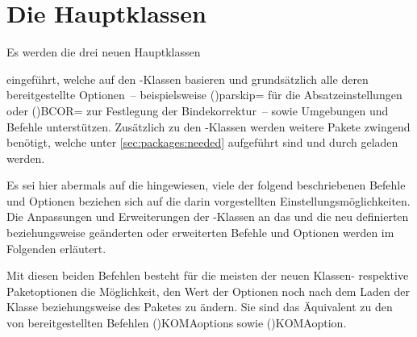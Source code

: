 \chapter[%
  Die Hauptklassen \Class{tudscrbook}, \Class{tudscrreprt} und 
  \Class{tudscrartcl}%
]{%
  Die Hauptklassen%
}

\begin{DeclareEntity*}{}
\begin{DeclareEntity*}{}
\begin{DeclareEntity*}{}
%
Es werden die drei neuen Hauptklassen
%
\begin{description}
\item {}
\item {}
\item {}
\end{description}
%
eingeführt, welche auf den \KOMAScript-Klassen basieren und grundsätzlich alle 
deren bereitgestellte Optionen~-- beispielsweise 
\Option(){parskip=\PMisc}
für die Absatzeinstellungen oder 
\Option(){BCOR=\PLength}
zur Festlegung der 
Bindekorrektur~-- sowie Umgebungen und Befehle unterstützen. Zusätzlich zu den 
\KOMAScript-Klassen werden weitere Pakete zwingend benötigt, welche unter 
\autoref{sec:packages:needed} aufgeführt sind und durch \TUDScript geladen 
werden.

Es sei hier abermals auf die  
hingewiesen, viele der folgend beschriebenen Befehle und Optionen beziehen sich 
auf die darin vorgestellten Einstellungsmöglichkeiten. Die Anpassungen und 
Erweiterungen der \KOMAScript-Klassen an das \CD und die neu definierten 
beziehungsweise geänderten oder erweiterten Befehle und Optionen werden im 
Folgenden erläutert.

\begin{Declaration}
  {}
\begin{Declaration}
  {}
\printdeclarationlist[Optionen|!]

Mit diesen beiden Befehlen besteht für die meisten der neuen Klassen- respektive
Paketoptionen die Möglichkeit, den Wert der Optionen noch nach dem Laden der 
Klasse beziehungsweise des Paketes zu ändern. Sie sind das Äquivalent zu den 
von \KOMAScript bereitgestellten Befehlen 
\Macro(){KOMAoptions} sowie 
\Macro(){KOMAoption}.


\end{Declaration}
\end{Declaration}
\end{DeclareEntity*}
\end{DeclareEntity*}
\end{DeclareEntity*}
